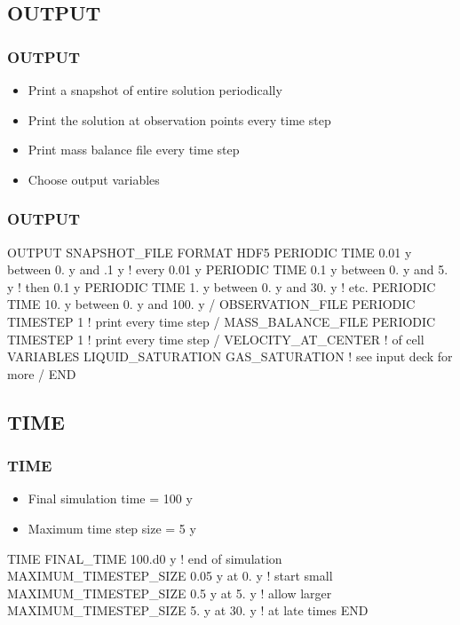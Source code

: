 \documentclass{beamer}
\newcommand\redcomment[1]{{{\color{red} #1}}}
\newcommand\bluecomment[1]{{{\color{blue} #1}}}
\begin{document}
\subsection{OUTPUT}

\begin{frame}[fragile]\frametitle{OUTPUT}
\begin{itemize}
  \item Print a \redcomment{snapshot} of entire solution periodically
  \item Print the solution at \redcomment{observation points} every time step
  \item Print \redcomment{mass balance} file every time step
  \item Choose output \redcomment{variables}
\end{itemize}

\end{frame}

\begin{frame}[fragile]\frametitle{OUTPUT}

\begin{semiverbatim}\small
OUTPUT
  SNAPSHOT_FILE
    FORMAT HDF5
    PERIODIC TIME 0.01 y between 0. y and .1 y \bluecomment{! every 0.01 y}
    PERIODIC TIME 0.1 y between 0. y and 5. y  \bluecomment{! then 0.1 y}
    PERIODIC TIME 1. y between 0. y and 30. y  \bluecomment{! etc.}
    PERIODIC TIME 10. y between 0. y and 100. y
  /
  OBSERVATION_FILE
    PERIODIC TIMESTEP 1 \bluecomment{! print every time step}
  /
  MASS_BALANCE_FILE
    PERIODIC TIMESTEP 1 \bluecomment{! print every time step}
  /
  VELOCITY_AT_CENTER \bluecomment{! of cell}
  VARIABLES
    LIQUID_SATURATION
    GAS_SATURATION \bluecomment{! see input deck for more}
  /
END
\end{semiverbatim}

\end{frame}

\subsection{TIME}

\begin{frame}[fragile]\frametitle{TIME}
\begin{itemize}
  \item \redcomment{Final} simulation \redcomment{time} = 100 y
  \item \redcomment{Maximum time step size} = 5 y
\end{itemize}

\begin{semiverbatim}

TIME
  FINAL_TIME 100.d0 y \bluecomment{! end of simulation}
  MAXIMUM_TIMESTEP_SIZE 0.05 y at 0. y \bluecomment{! start small}
  MAXIMUM_TIMESTEP_SIZE 0.5 y at 5. y \bluecomment{! allow larger}
  MAXIMUM_TIMESTEP_SIZE 5. y at 30. y \bluecomment{! at late times}
END
\end{semiverbatim}

\end{frame}
\end{document}
